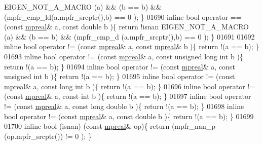 \begin{DoxyCode}
      EIGEN\_NOT\_A\_MACRO (a) && (b == b) && (mpfr\_cmp\_ld(a.mpfr\_srcptr(),b) == 0 );   \}
01690 \textcolor{keyword}{inline} \textcolor{keywordtype}{bool} operator == (\textcolor{keyword}{const} \hyperlink{classmpfr_1_1mpreal}{mpreal}& a, \textcolor{keyword}{const} \textcolor{keywordtype}{double} b            )\{  \textcolor{keywordflow}{return} !isnan 
      EIGEN\_NOT\_A\_MACRO (a) && (b == b) && (mpfr\_cmp\_d (a.mpfr\_srcptr(),b) == 0 );   \}
01691 
01692 \textcolor{keyword}{inline} \textcolor{keywordtype}{bool} operator != (\textcolor{keyword}{const} \hyperlink{classmpfr_1_1mpreal}{mpreal}& a, \textcolor{keyword}{const} \hyperlink{classmpfr_1_1mpreal}{mpreal}& b           )\{  \textcolor{keywordflow}{return} !(a == b);  \}
01693 \textcolor{keyword}{inline} \textcolor{keywordtype}{bool} operator != (\textcolor{keyword}{const} \hyperlink{classmpfr_1_1mpreal}{mpreal}& a, \textcolor{keyword}{const} \textcolor{keywordtype}{unsigned} \textcolor{keywordtype}{long} \textcolor{keywordtype}{int} b )\{  \textcolor{keywordflow}{return} !(a == b);  \}
01694 \textcolor{keyword}{inline} \textcolor{keywordtype}{bool} operator != (\textcolor{keyword}{const} \hyperlink{classmpfr_1_1mpreal}{mpreal}& a, \textcolor{keyword}{const} \textcolor{keywordtype}{unsigned} \textcolor{keywordtype}{int} b      )\{  \textcolor{keywordflow}{return} !(a == b);  \}
01695 \textcolor{keyword}{inline} \textcolor{keywordtype}{bool} operator != (\textcolor{keyword}{const} \hyperlink{classmpfr_1_1mpreal}{mpreal}& a, \textcolor{keyword}{const} \textcolor{keywordtype}{long} \textcolor{keywordtype}{int} b          )\{  \textcolor{keywordflow}{return} !(a == b);  \}
01696 \textcolor{keyword}{inline} \textcolor{keywordtype}{bool} operator != (\textcolor{keyword}{const} \hyperlink{classmpfr_1_1mpreal}{mpreal}& a, \textcolor{keyword}{const} \textcolor{keywordtype}{int} b               )\{  \textcolor{keywordflow}{return} !(a == b);  \}
01697 \textcolor{keyword}{inline} \textcolor{keywordtype}{bool} operator != (\textcolor{keyword}{const} \hyperlink{classmpfr_1_1mpreal}{mpreal}& a, \textcolor{keyword}{const} \textcolor{keywordtype}{long} \textcolor{keywordtype}{double} b       )\{  \textcolor{keywordflow}{return} !(a == b);  \}
01698 \textcolor{keyword}{inline} \textcolor{keywordtype}{bool} operator != (\textcolor{keyword}{const} \hyperlink{classmpfr_1_1mpreal}{mpreal}& a, \textcolor{keyword}{const} \textcolor{keywordtype}{double} b            )\{  \textcolor{keywordflow}{return} !(a == b);  \}
01699 
01700 \textcolor{keyword}{inline} bool (isnan)    (\textcolor{keyword}{const} \hyperlink{classmpfr_1_1mpreal}{mpreal}& op)\{    \textcolor{keywordflow}{return} (mpfr\_nan\_p    (op.mpfr\_srcptr()) != 0 );    \}

\end{DoxyCode}
